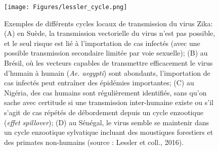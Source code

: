\begin{figure}[t]
	\centering
	\texttt{[image: Figures/lessler\_cycle.png]}
	\caption[Exemples de différents cycles locaux de transmission du virus Zika (source : Lessler et coll., 2016)]{Exemples de différents cycles locaux de transmission du virus Zika: (A) en Suède, la transmission vectorielle du virus n'est pas possible, et le seul risque est lié à l'importation de cas infectés (avec une possible transmission secondaire limitée par voie sexuelle); (B) au Brésil, où les vecteurs capables de transmettre efficacement le virus d'humain à humain ({\em Ae. aegypti}) sont abondants, l'importation de cas infectés peut entraîner des épidémies importantes; (C) au Nigéria, des cas humains sont régulièrement identifiés, sans qu'on sache avec certitude si une transmission inter-humaine existe ou s'il s'agit de cas répétés de débordement depuis un cycle enzootique (\textit{effet spillover}); (D) au Sénégal, le virus semble se maintenir dans un cycle enzootique sylvatique incluant des moustiques forestiers et des primates non-humains (source : Lessler et coll., 2016).}
	\label{fig:lesslercycle}
\end{figure}

